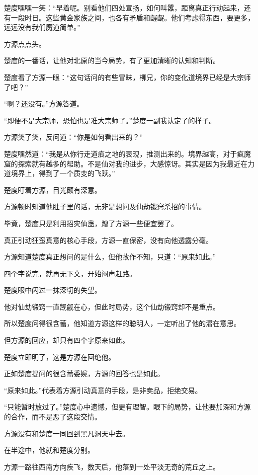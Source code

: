 \begin{this_body}
楚度嘿嘿一笑：“早着呢。别看他们四处宣扬，如何叫嚣，距离真正行动起来，还有一段时日。这些黄金家族之间，也各有矛盾和龌龊。他们考虑得东西，要更多，远远没有我们魔道简单。”

方源点点头。

楚度的一番话，让他对北原的当今局势，有了更加清晰的认知和判断。

楚度看了方源一眼：“这句话问的有些冒昧，柳兄，你的变化道境界已经是大宗师了吧？”

“啊？还没有。”方源答道。

“即便不是大宗师，恐怕也是准大宗师了。”楚度一副我认定了的样子。

方源笑了笑，反问道：“你是如何看出来的？”

楚度嘿然道：“我是从你行走道痕之地的表现，推测出来的。境界越高，对于疯魔窟的探索就有越多的帮助。不是仙对我的进步，大感惊讶。其实是因为我最近在力道境界上，得到了一个质变的飞跃。”

楚度盯着方源，目光颇有深意。

方源顿时知道他肚子里的话，无非是想问及仙劫锻窍杀招的事情。

毕竟，楚度只是利用招灾仙蛊，蹭了方源一些便宜罢了。

真正引动狂蛮真意的核心手段，方源一直保密，没有向他透露分毫。

方源知道楚度真正想问的是什么，但他故作不知，只道：“原来如此。”

四个字说完，就再无下文，开始闷声赶路。

楚度眼中闪过一抹深切的失望。

他对仙劫锻窍一直觊觎在心，但此时局势，这个仙劫锻窍却不是重点。

所以楚度问得很含蓄，他知道方源这样的聪明人，一定听出了他的潜在意思。

但方源的回应，却只有四个字原来如此。

楚度立即明了，这是方源在回绝他。

正如楚度提问的很含蓄委婉，方源的回答也是如此。

“原来如此。”代表着方源引动真意的手段，是非卖品，拒绝交易。

“只能暂时放过了。”楚度心中遗憾，但更有理智。眼下的局势，让他要加深和方源的合作，而不是恶了这段交情。

方源没有和楚度一同回到黑凡洞天中去。

在半途中，他就和楚度分别。

方源一路往西南方向疾飞，数天后，他落到一处平淡无奇的荒丘之上。


\end{this_body}
